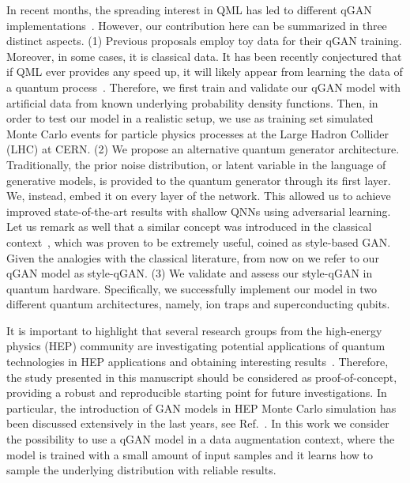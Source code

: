 \documentclass[twocolumn,preprintnumbers,superscriptaddress]{revtex4-2}
\begin{document}
In recent months, the spreading interest in QML has led to different qGAN
implementations~\cite{zoufal2019quantum, zeng2019learning, situ2020quantum,
  hu2019quantum, benedetti2019adversarial, romero2021variational,
  niu2021entangling}. However, our contribution here can be summarized in three
distinct aspects. (1) Previous proposals employ toy data for their qGAN
training. Moreover, in some cases, it is classical data. It has been recently
conjectured that if QML ever provides any speed up, it will likely appear from
learning the data of a quantum process~\cite{huang2021information,
  kubler2021inductive}. Therefore, we first train and validate our qGAN model with
artificial data from known underlying probability density functions. Then, in
order to test our model in a realistic setup, we use as training set simulated
Monte Carlo events for particle physics processes at the Large Hadron Collider
(LHC) at CERN. (2) We propose an alternative quantum generator architecture. Traditionally, the prior noise distribution, or latent variable in the language of generative models, is provided to the quantum generator through its first layer. We, instead, embed it on every layer
of the network. This
allowed us to achieve improved state-of-the-art results with shallow QNNs using
adversarial learning. Let us remark as well that a similar concept was introduced in the classical context~\cite{karras2019style}, which was proven to be extremely useful, coined as style-based GAN. Given the analogies with the classical literature, from now on we refer to our qGAN model as style-qGAN. (3) We validate and
assess our style-qGAN in quantum hardware. Specifically, we successfully implement our
model in two different quantum architectures, namely, ion traps and
superconducting qubits.

It is important to highlight that several research groups from the high-energy
physics (HEP) community are investigating potential applications of quantum
technologies in HEP applications and obtaining interesting
results~\cite{P_rez_Salinas_2021,Guan_2021,chang2021quantum,Chang_2021,Belis_2021,khattak2021fast}.
Therefore, the study presented in this manuscript should be considered as
proof-of-concept, providing a robust and reproducible starting point for future
investigations. In particular, the introduction of GAN models in HEP Monte Carlo
simulation has been discussed extensively in the last years, see
Ref.~\cite{baldi2021gan,Backes_2021,butter2020generative,Butter_2021,Butter_2020,Bellagente_2020,Butter_2019}.
In this work we consider the possibility to use a qGAN model in a data
augmentation context, where the model is trained with a small amount of input
samples and it learns how to sample the underlying distribution with reliable
results.
\end{document}
